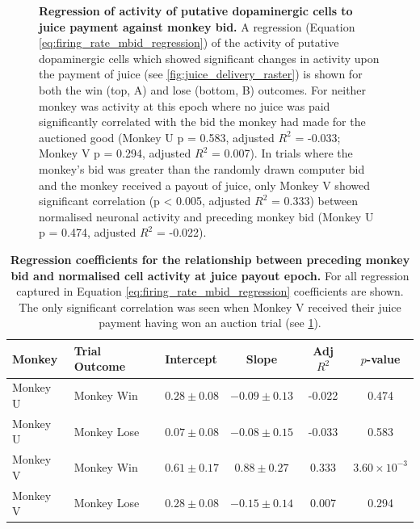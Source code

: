 \begin{figure}[p]
\centering    

\caption[Regression of activity of putative dopaminergic cells to juice payment against monkey bid.]{\textbf{Regression of activity of putative dopaminergic cells to juice payment against monkey bid.} A regression (Equation \ref{eq:firing_rate_mbid_regression}) of the activity of putative dopaminergic cells which showed significant changes in activity upon the payment of juice (see \ref{fig:juice_delivery_raster}) is shown for both the win (top, A) and lose (bottom, B) outcomes. For neither monkey was activity at this epoch where no juice was paid significantly correlated with the bid the monkey had made for the auctioned good (Monkey U p = 0.583, adjusted $R^2$ = -0.033; Monkey V p = 0.294, adjusted $R^2$ = 0.007). In trials where the monkey's bid was greater than the randomly drawn computer bid and the monkey received a payout of juice, only Monkey V showed significant correlation (p < 0.005, adjusted $R^2$ = 0.333) between normalised neuronal activity and preceding monkey bid (Monkey U p = 0.474, adjusted $R^2$ = -0.022).}
\label{fig:juice_delivery_bid_regression}
\end{figure}

\begin{table}[htbp]
\centering
\begin{tabular}{lllccc}
\hline
\textbf{Monkey} & \textbf{Trial Outcome} & \textbf{Intercept} & \textbf{Slope} & \textbf{Adj} $R^2$ & $p$\textbf{-value} \\
\hline
Monkey U & Monkey Win & $0.28 \pm 0.08$ & $-0.09 \pm 0.13$ & -0.022 & 0.474 \\
Monkey U & Monkey Lose & $0.07 \pm 0.08$ & $-0.08 \pm 0.15$ & -0.033 & 0.583 \\
\hline
Monkey V & Monkey Win & $0.61 \pm 0.17$ & $0.88 \pm 0.27$ & 0.333 & $3.60 \times 10^{-3}$ \\
Monkey V & Monkey Lose & $0.28 \pm 0.08$ & $-0.15 \pm 0.14$ & 0.007 & 0.294 \\
\hline
\end{tabular}
\caption[Regression coefficients for the relationship between preceding monkey bid and normalised cell activity at juice payout epoch.]{\textbf{Regression coefficients for the relationship between preceding monkey bid and normalised cell activity at juice payout epoch.} For all regression captured in Equation \ref{eq:firing_rate_mbid_regression} coefficients are shown. The only significant correlation was seen when Monkey V received their juice payment having won an auction trial (see \ref{fig:juice_delivery_bid_regression}).}
\label{tab:juice_delivery_regression_results}
\end{table}

